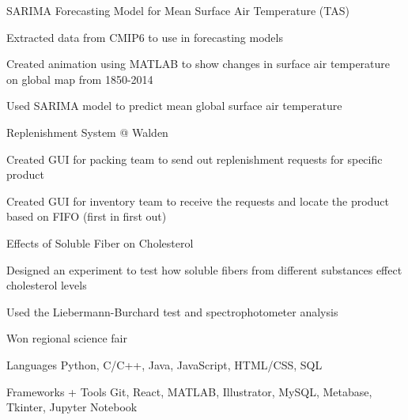 \documentclass[12pt, letterpaper]{awesome-cv}
\begin{document}
\begin{cventries}
  \cventry
    {} %
    {SARIMA Forecasting Model for Mean Surface Air Temperature (TAS)} %
    {} %
    {} %
    {
      \vspace{-0.2in}
      \begin{cvitems} %
        \item {Extracted data from CMIP6 to use in forecasting models}
        \item {Created animation using MATLAB to show changes in surface air temperature on global map from 1850-2014}
        \item {Used SARIMA model to predict mean global surface air temperature}
      \end{cvitems}
    }

  \cventry
    {} %
    {Replenishment System @ Walden} %
    {} %
    {} %
    {
      \vspace{-0.2in}
      \begin{cvitems} %
        \vspace{-0.1in}
        \item {Created GUI for packing team to send out replenishment requests for specific product}
        \item {Created GUI for inventory team to receive the requests and locate the product based on FIFO (first in first out)}
      \end{cvitems}
    }

    \cventry
    {} %
    {Effects of Soluble Fiber on Cholesterol} %
    {} %
    {} %
    {
      \vspace{-0.2in}
      \begin{cvitems} %
        \item {Designed an experiment to test how soluble fibers from different substances effect cholesterol levels}
        \item {Used the Liebermann-Burchard test and spectrophotometer analysis}
        \item {Won regional science fair}
      \end{cvitems}
    }
\end{cventries}

\begin{cvskills}
  \cvskill
    {Languages} %
    {Python, C/C++, Java, JavaScript, HTML/CSS, SQL} %

  \cvskill
    {Frameworks + Tools} %
    {Git, React, MATLAB, Illustrator, MySQL, Metabase, Tkinter, Jupyter Notebook} %
  
    
\end{cvskills}

\end{document}
